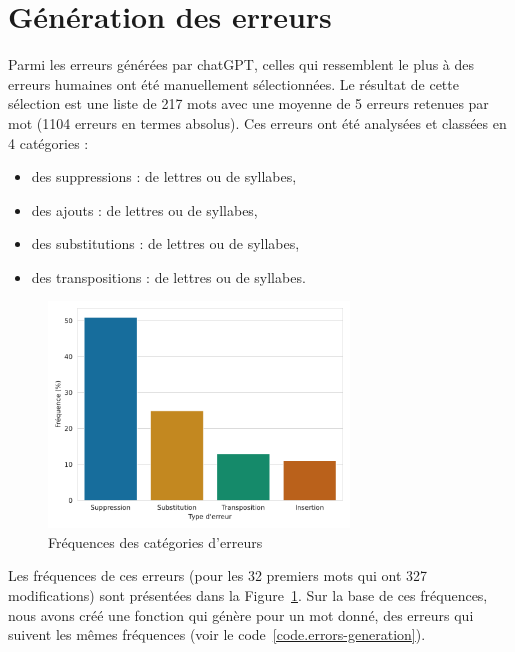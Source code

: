 \section{Génération des erreurs}%
\label{sec.results.errors}

Parmi les erreurs générées par chatGPT, 
celles qui ressemblent le plus à des erreurs humaines ont été manuellement sélectionnées.
Le résultat de cette sélection est une liste de 217 mots 
avec une moyenne de 5 erreurs retenues par mot (1104 erreurs en termes absolus).
Ces erreurs ont été analysées et classées en 4 catégories :
\begin{itemize}
    \item des suppressions : de lettres ou de syllabes,
    \item des ajouts : de lettres ou de syllabes,
    \item des substitutions : de lettres ou de syllabes,
    \item des transpositions : de lettres ou de syllabes.
\end{itemize}

\begin{figure}[hbt]
    \centering
    \includegraphics[width=8cm]{assets/python/rules-stats.pdf}
    \caption{Fréquences des catégories d'erreurs}
    \label{fig.errors-freq}
\end{figure}

Les fréquences de ces erreurs (pour les 32 premiers mots qui ont 327 modifications) 
sont présentées dans la Figure~\ref{fig.errors-freq}.
Sur la base de ces fréquences, nous avons créé une fonction qui génère pour un mot donné,
des erreurs qui suivent les mêmes fréquences (voir le code~\ref{code.errors-generation}).

